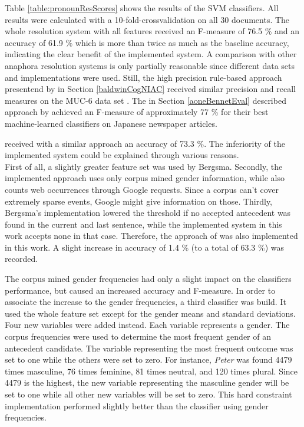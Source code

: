 Table \ref{table:pronounResScores} shows the results of the SVM classifiers. All results were calculated with a 10-fold-crossvalidation on all 30 documents. The whole resolution system with all features received an F-measure of 76.5 \% and an accuracy of 61.9 \% which is more than twice as much as the baseline accuracy, indicating the clear benefit of the implemented system. A comparison with other anaphora resolution systems is only partially reasonable since different data sets and implementations were used. Still, the high precision rule-based approach presentend by \cite{baldwin1997cogniac} in Section \ref{baldwinCogNIAC} received similar precision and recall measures on the MUC-6 data set \citep{grishman1996message}. The in Section \ref{aoneBennetEval} described approach by \cite{aone1995evaluating} achieved an F-measure of approximately 77 \% for their best machine-learned classifiers on Japanese newspaper articles.

\cite{bergsma2005automatic} received with a similar approach an accuracy of 73.3 \%. The inferiority of the implemented system could be explained through various reasons. \\
First of all, a slightly greater feature set was used by Bergsma. Secondly, the implemented approach uses only corpus mined gender information, while \cite{bergsma2005automatic} also counts web occurrences through Google requests. Since a corpus can't cover extremely sparse events, Google might give information on those. Thirdly, Bergsma's implementation lowered the threshold if no accepted antecedent was found in the current and last sentence, while the implemented system in this work accepts none in that case. Therefore, the approach of \cite{bergsma2005automatic} was also implemented in this work. A slight increase in accuracy of 1.4 \% (to a total of 63.3 \%) was recorded. 

The corpus mined gender frequencies had only a slight impact on the classifiers performance, but caused an increased accuracy and F-measure. In order to associate the increase to the gender frequencies, a third classifier was build. It used the whole feature set except for the gender means and standard deviations. Four new variables were added instead. Each variable represents a gender. The corpus frequencies were used to determine the most frequent gender of an antecedent candidate. The variable representing the most frequent outcome was set to one while the others were set to zero. For instance, \textit{Peter} was found 4479 times masculine, 76 times feminine, 81 times neutral, and 120 times plural. Since 4479 is the highest, the new variable representing the masculine gender will be set to one while all other new variables will be set to zero. This hard constraint implementation performed slightly better than the classifier using gender frequencies.

